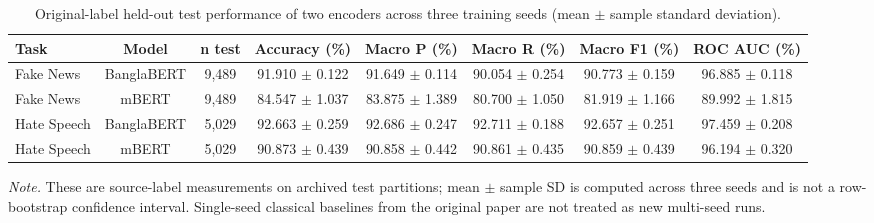 \begin{table}[H]
\centering
\caption{Original-label held-out test performance of two encoders across three training seeds (mean $\pm$ sample standard deviation).}
\label{tab:main}
\footnotesize
\begin{adjustbox}{max width=\linewidth}
\begin{tabular}{lccccccc}
\toprule
Task & Model & n test & Accuracy (\%) & Macro P (\%) & Macro R (\%) & Macro F1 (\%) & ROC AUC (\%) \\
\midrule
Fake News & BanglaBERT & 9,489 & 91.910 $\pm$ 0.122 & 91.649 $\pm$ 0.114 & 90.054 $\pm$ 0.254 & 90.773 $\pm$ 0.159 & 96.885 $\pm$ 0.118 \\
Fake News & mBERT & 9,489 & 84.547 $\pm$ 1.037 & 83.875 $\pm$ 1.389 & 80.700 $\pm$ 1.050 & 81.919 $\pm$ 1.166 & 89.992 $\pm$ 1.815 \\
Hate Speech & BanglaBERT & 5,029 & 92.663 $\pm$ 0.259 & 92.686 $\pm$ 0.247 & 92.711 $\pm$ 0.188 & 92.657 $\pm$ 0.251 & 97.459 $\pm$ 0.208 \\
Hate Speech & mBERT & 5,029 & 90.873 $\pm$ 0.439 & 90.858 $\pm$ 0.442 & 90.861 $\pm$ 0.435 & 90.859 $\pm$ 0.439 & 96.194 $\pm$ 0.320 \\
\bottomrule
\end{tabular}
\end{adjustbox}
\par\vspace{2pt}
\begin{minipage}{\linewidth}
\scriptsize\emph{Note.} These are source-label measurements on archived test partitions; mean $\pm$ sample SD is computed across three seeds and is not a row-bootstrap confidence interval. Single-seed classical baselines from the original paper are not treated as new multi-seed runs.
\end{minipage}
\end{table}

